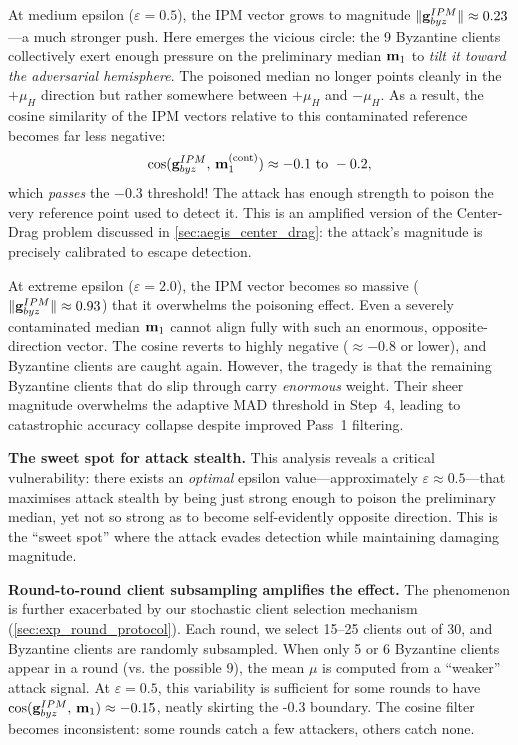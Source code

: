 \documentclass[../main.tex]{subfiles}
\begin{document}
At medium epsilon ($\varepsilon=0.5$), the IPM vector grows to magnitude $\|\mathbf{g}_{byz}^{IPM}\| \approx 0.23$---a much stronger push. Here emerges the vicious circle: the 9 Byzantine clients collectively exert enough pressure on the preliminary median $\mathbf{m}_{1}$ to \emph{tilt it toward the adversarial hemisphere}. The poisoned median no longer points cleanly in the $+\mu_H$ direction but rather somewhere between $+\mu_H$ and $-\mu_H$. As a result, the cosine similarity of the IPM vectors relative to this contaminated reference becomes far less negative:
\begin{equation}
    \cos(\mathbf{g}_{byz}^{IPM},\, \mathbf{m}_{1}^{(\mathrm{cont})}) \approx -0.1 \text{ to } -0.2,
\end{equation}
which \emph{passes} the $-0.3$ threshold! The attack has enough strength to poison the very reference point used to detect it. This is an amplified version of the Center-Drag problem discussed in \cref{sec:aegis_center_drag}: the attack's magnitude is precisely calibrated to escape detection.

At extreme epsilon ($\varepsilon=2.0$), the IPM vector becomes so massive ($\|\mathbf{g}_{byz}^{IPM}\| \approx 0.93$) that it overwhelms the poisoning effect. Even a severely contaminated median $\mathbf{m}_{1}$ cannot align fully with such an enormous, opposite-direction vector. The cosine reverts to highly negative ($\approx -0.8$ or lower), and Byzantine clients are caught again. However, the tragedy is that the remaining Byzantine clients that do slip through carry \emph{enormous} weight. Their sheer magnitude overwhelms the adaptive MAD threshold in Step~4, leading to catastrophic accuracy collapse despite improved Pass~1 filtering.

\textbf{The sweet spot for attack stealth.} This analysis reveals a critical vulnerability: there exists an \emph{optimal} epsilon value---approximately $\varepsilon \approx 0.5$---that maximises attack stealth by being just strong enough to poison the preliminary median, yet not so strong as to become self-evidently opposite direction. This is the ``sweet spot'' where the attack evades detection while maintaining damaging magnitude.

\textbf{Round-to-round client subsampling amplifies the effect.} The phenomenon is further exacerbated by our stochastic client selection mechanism (\cref{sec:exp_round_protocol}). Each round, we select 15--25 clients out of 30, and Byzantine clients are randomly subsampled. When only 5 or 6 Byzantine clients appear in a round (vs. the possible 9), the mean $\mu$ is computed from a ``weaker'' attack signal. At $\varepsilon=0.5$, this variability is sufficient for some rounds to have $\cos(\mathbf{g}_{byz}^{IPM},\, \mathbf{m}_{1}) \approx -0.15$, neatly skirting the -0.3 boundary. The cosine filter becomes inconsistent: some rounds catch a few attackers, others catch none.
\end{document}
